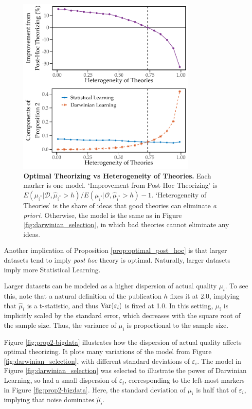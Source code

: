 \documentclass[12pt,english]{article}
\theoremstyle{plain}
\theoremstyle{plain}
\begin{document}
\begin{figure}
    \centering
    \includegraphics[width=0.8\textwidth]{exhibits/many-qgood.pdf}
    \caption{\textbf{Optimal Theorizing vs Heterogeneity of Theories.} Each marker is one model. `Improvement from Post-Hoc Theorizing' is $E\left(\mu_{i^{\ast}}|\mathcal{D}, \hat{\mu}_{i^{\ast}}>h\right)/E\left(\mu_{i^{\ast}}|\mathcal{O}, \hat{\mu}_{i^{\ast}}>h\right)-1$. `Heterogeneity of Theories' is the share of ideas that good theories can eliminate \emph{a priori}. Otherwise, the model is the same as in Figure \ref{fig:darwinian_selection}, in which bad theories cannot eliminate any ideas.}
    \label{fig:prop2-het}
\end{figure}

Another implication of Proposition \ref{prop:optimal_post_hoc} is that larger datasets tend to imply \emph{post hoc} theory is optimal. Naturally, larger datasets imply more Statistical Learning. 

Larger datasets can be modeled as a higher dispersion of actual quality $\mu_i$. To see this, note that a natural definition of the publication $h$ fixes it at 2.0, implying that $\hat{\mu}_i$ is a t-statistic, and thus $\text{Var}(\varepsilon_i)$ is fixed at 1.0. In this setting, $\mu_i$ is implicitly scaled by the standard error, which decreases with the square root of the sample size. Thus, the variance of $\mu_i$ is proportional to the sample size.

Figure \ref{fig:prop2-bigdata} illustrates how the dispersion of actual quality affects optimal theorizing. It plots many variations of the model from Figure \ref{fig:darwinian_selection}, with different standard deviations of $\varepsilon_i$. The model in Figure \ref{fig:darwinian_selection} was selected to illustrate the power of Darwinian Learning, so had a small dispersion of $\varepsilon_i$, corresponding to the left-most markers in Figure \ref{fig:prop2-bigdata}. Here, the standard deviation of $\mu_i$ is half that of $\varepsilon_i$, implying that noise dominates $\hat{\mu}_i$.
\end{document}
